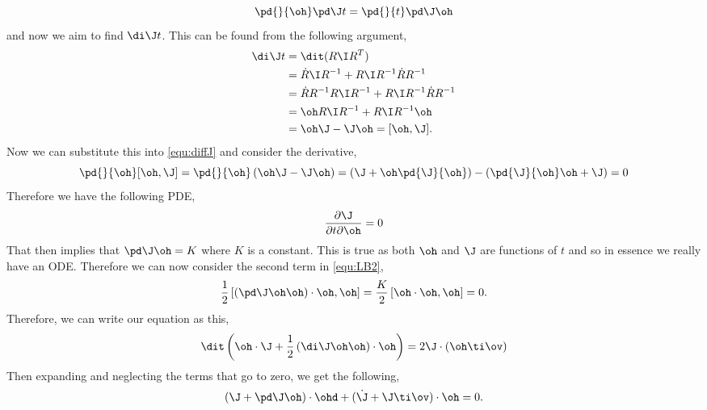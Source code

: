 \begin{equation}
  \pd{}{\oh}\pd \J t = \pd{}{t}\pd \J \oh\label{equ:diffJ}
\end{equation}
and now we aim to find $\di \J t$. This can be found from the following argument,
\begin{align*}
  \di\J t &= \dit (R\I R^T)\\
  &= \dot R\I R^{-1} + R\I R^{-1}\dot RR^{-1} \\
  &= \dot R R^{-1}R\I R^{-1} + R\I R^{-1}\dot RR^{-1}\\
  &= \oh R\I R^{-1} + R\I R^{-1}\oh \\
  &= \oh\J - \J\oh = [\oh, \J].
\end{align*}
\noindent
Now we can substitute this into \ref{equ:diffJ} and consider the derivative,
$$ \pd{}{\oh} [\oh, \J] = \pd{}{\oh} \left( \oh\J - \J\oh \right) = \left(\J + \oh\pd{\J}{\oh}\right) - \left(\pd{\J}{\oh}\oh + \J\right) = 0 $$
Therefore we have the following PDE,
$$ \frac{\partial\J}{\partial t\partial \oh} = 0 $$
That then implies that $\pd \J \oh = K$ where $K$ is a constant. This is true as both $\oh$ and $\J$ are functions of $t$ and so in essence we really have an ODE. Therefore we can now consider the second term in \ref{equ:LB2},
$$ \frac{1}{2}\left[\left(\pd \J \oh\oh\right)\cdot \oh, \oh\right] = \frac{K}{2}\left[ \oh \cdot \oh, \oh \right] = 0. $$
Therefore, we can write our equation as this,
$$ \dit \left( \oh \cdot \J + \frac{1}{2}\left( \di \J \oh \oh \right) \cdot \oh \right) = 2\J \cdot (\oh \ti \ov)$$
Then expanding and neglecting the terms that go to zero, we get the following,
$$ \left( \J + \pd \J \oh \right) \cdot \ohd + (\dot\J + \J \ti \ov) \cdot \oh = 0. $$

